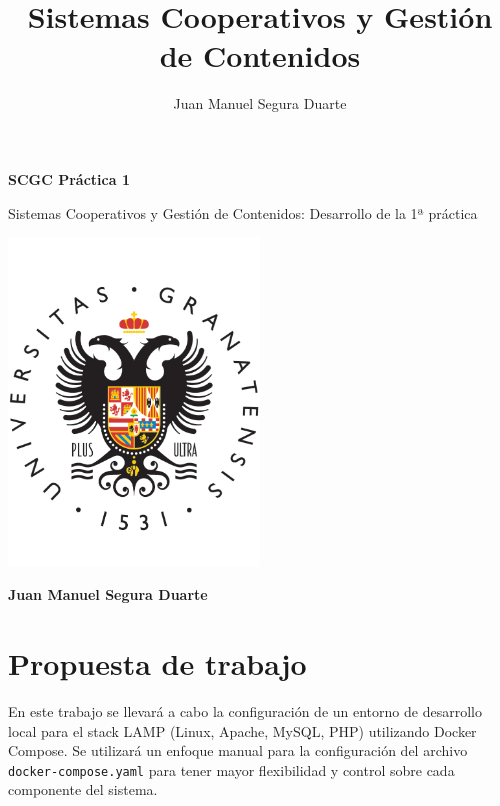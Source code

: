 \documentclass[a4paper]{article}
\title{Sistemas Cooperativos y Gestión de Contenidos}
\author{Juan Manuel Segura Duarte}
\begin{document}
\begin{titlepage}
    \centering
    \vspace*{3cm}  %
    {\Huge \textbf{SCGC Práctica 1}} %
    \vspace{1cm}
    
    {\Large Sistemas Cooperativos y Gestión de Contenidos: Desarrollo de la 1ª práctica} %
    
    \includegraphics[width=0.5\textwidth]{images/ugr_logo.png}
    \vspace{1cm}
    
    \textbf{\Large Juan Manuel Segura Duarte} %
\end{titlepage}
\newpage

\thispagestyle{empty}
\tableofcontents


\newpage
{}
\setcounter{page}{1}

\section{Propuesta de trabajo}

En este trabajo se llevará a cabo la configuración de un entorno de desarrollo local para el stack LAMP (Linux, Apache, MySQL, PHP) utilizando Docker Compose. Se utilizará un enfoque manual para la configuración del archivo \texttt{docker-compose.yaml} para tener mayor flexibilidad y control sobre cada componente del sistema.
\end{document}
